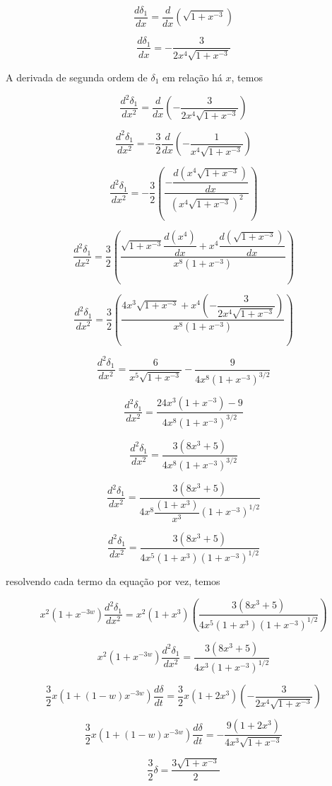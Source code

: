 \documentclass[a4paper,12pt]{article}
\begin{document}
$$\dfrac{d \delta_1}{dx} = \dfrac{d}{dx}\left( \sqrt{1+x^{-3}}\right)$$

$$\dfrac{d \delta_1}{dx} = - \dfrac{3}{2x^4\sqrt{1+x^{-3}}}$$

A derivada de segunda ordem de $\delta_1$ em relação há $x$, temos

$$\dfrac{d^2 \delta_1}{dx^2} = \dfrac{d}{dx}\left(- \dfrac{3}{2x^4\sqrt{1+x^{-3}}}\right)$$

$$\dfrac{d^2 \delta_1}{dx^2} = -\dfrac{3}{2}\dfrac{d}{dx}\left(- \dfrac{1}{x^4\sqrt{1+x^{-3}}}\right)$$

$$\dfrac{d^2 \delta_1}{dx^2} = -\dfrac{3}{2}\left(\dfrac{-\dfrac{d (x^4\sqrt{1+x^{-3}})}{dx}}{(x^4\sqrt{1+x^{-3}})^2}\right)$$

$$\dfrac{d^2 \delta_1}{dx^2} = \dfrac{3}{2}\left(\dfrac{\sqrt{1+x^{-3}}\dfrac{d (x^4)}{dx}+x^4\dfrac{d(\sqrt{1+x^{-3}})}{dx}}{x^8(1+x^{-3})}\right)$$

$$\dfrac{d^2 \delta_1}{dx^2} = \dfrac{3}{2}\left(\dfrac{4x^3\sqrt{1+x^{-3}}+x^4\left(- \dfrac{3}{2x^4\sqrt{1+x^{-3}}}\right)}{x^8(1+x^{-3})}\right)$$

$$\dfrac{d^2 \delta_1}{dx^2} = \dfrac{6}{x^5\sqrt{1+ x^{-3}} }-\frac{9}{4x^8 \left(1+x^{-3}\right)^{3/2} }$$

$$ \dfrac{d^2 \delta_1}{dx^2} = \dfrac{24x^3 (1+x^{-3}) - 9}{4x^8 \left(1+x^{-3}\right)^{3/2} }$$

$$ \dfrac{d^2 \delta_1}{dx^2} = \dfrac{3 (8x^3 + 5)}{4x^8 \left(1+x^{-3}\right)^{3/2} }$$

$$ \dfrac{d^2 \delta_1}{dx^2} = \dfrac{3 (8x^3 + 5)}{4x^8\dfrac{(1+x^3)}{x^3} \left(1+x^{-3}\right)^{1/2} }$$

$$ \dfrac{d^2 \delta_1}{dx^2} = \dfrac{3 (8x^3 + 5)}{4x^5 (1+x^3)\left(1+x^{-3}\right)^{1/2} }$$

resolvendo cada termo da equação por vez, temos

$$x^2 (1+x^{-3w})\dfrac{d^2\delta_1}{dx^2} = x^2 (1+x^3)\left( \dfrac{3 (8x^3 + 5)}{4x^5 (1+x^3)\left(1+x^{-3}\right)^{1/2} }\right)$$

$$x^2 (1+x^{-3w})\dfrac{d^2\delta_1}{dx^2} = \dfrac{3 (8x^3 + 5)}{4x^3\left(1+x^{-3}\right)^{1/2} }$$

$$\dfrac{3}{2}x(1+ (1-w)x^{-3w})\dfrac{d\delta}{dt} = \dfrac{3}{2}x(1+ 2x^{3})\left(  - \dfrac{3}{2x^4\sqrt{1+x^{-3}}}\right)$$

$$\dfrac{3}{2}x(1+ (1-w)x^{-3w})\dfrac{d\delta}{dt} =- \dfrac{9(1+ 2x^{3})}{4x^3\sqrt{1+x^{-3}}}$$

$$\dfrac{3}{2}\delta = \dfrac{3\sqrt{1+x^{-3}}}{2}$$
\end{document}
